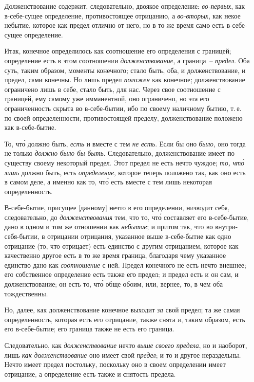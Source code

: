 Долженствование содержит, следовательно, двоякое
определение: \emph{во-первых}, как в-себе-сущее определение,
противостоящее отрицанию, а \emph{во-вторых}, как некое небытие,
которое как предел отлично от него, но в то же
время само есть в-себе-сущее определение.

Итак, конечное определилось как соотношение его
определения с границей; определение есть в этом соотношении
\emph{долженствование}, а граница~-- \emph{предел}. Оба суть,
таким образом, моменты конечного; стало быть, оба, и
долженствование, и предел, сами конечны. Но лишь предел
\emph{положен} как конечное; долженствование ограничено
лишь в себе, стало быть, для нас. Через свое соотношение
с границей, ему самому уже имманентной, оно
ограничено, но эта его ограниченность скрыта во в-себе-бытии,
ибо по своему наличному бытию, т.\,е. по своей
определенности, противостоящей пределу, долженствование
положено как в-себе-бытие.

То, чт\'о должно быть, \emph{есть} и вместе с тем \emph{не есть}.
Если бы оно \emph{было}, оно тогда не только \emph{должно было бы
быть}. Следовательно, долженствование имеет по существу
своему некоторый предел. Этот предел не есть нечто
чуждое; \emph{то, чт\'о лишь} должно быть, есть \emph{определение},
которое теперь положено так, как оно есть в самом деле,
а именно как то, чт\'о есть вместе с тем лишь некоторая
определенность.

В-себе-бытие, присущее [данному] нечто в его определении,
низводит себя, следовательно, до \emph{долженствования}
тем, что то, чт\'о составляет его в-себе-бытие, дано в одном
и том же отношении как \emph{небытие}; и притом так, что во
внутри-себя-бытии, в отрицании отрицания, указанное
выше в-себе-бытие как одно отрицание (то, что отрицает)
есть единство с другим отрицанием, которое как качественно
другое есть в то же время граница, благодаря чему
указанное единство дано как \emph{соотношение} с ней. Предел
конечного не есть нечто внешнее; его собственное определение
есть также его предел; и предел есть и он сам, и
долженствование; он есть то, чт\'о обще обоим, или, вернее,
то, в чем оба тождественны.

Но, далее, как долженствование конечное выходит \emph{за}
свой предел; та же самая определенность, которая есть
его отрицание, также снята и, таким образом, есть его
в-себе-бытие; его граница также не есть его граница.

Следовательно, как \emph{долженствование} нечто \emph{выше своего
предела}, но и наоборот, лишь \emph{как долженствование}
оно имеет свой \emph{предел}; и то и другое нераздельны. Нечто
имеет предел постольку, поскольку оно в своем определении
имеет отрицание, а определение есть также и снятость
предела.


